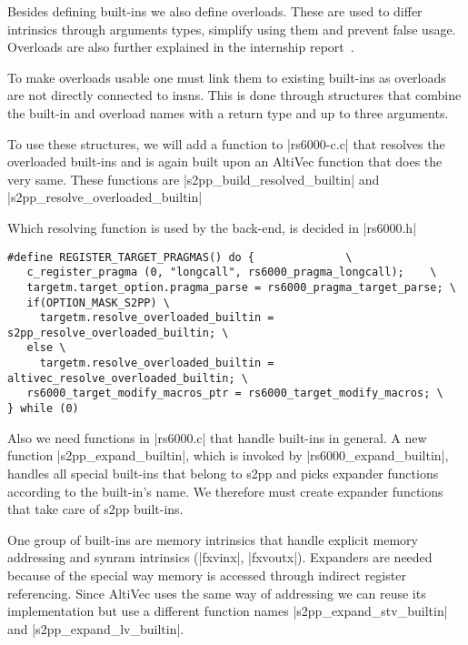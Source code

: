 Besides defining built-ins we also define overloads.
These are used to differ intrinsics through arguments types, simplify using them and prevent false usage.
Overloads are also further explained in the internship report~\citep{heimbrecht_2017internship}.

To make overloads usable one must link them to existing built-ins as overloads are not directly connected to insns.
This is done through structures that combine the built-in and overload names with a return type and up to three arguments.

To use these structures, we will add a function to |rs6000-c.c| that resolves the overloaded built-ins and is again built upon an AltiVec function that does the very same.
These functions are |s2pp_build_resolved_builtin| and |s2pp_resolve_overloaded_builtin|

Which resolving function is used by the back-end, is decided in |rs6000.h|
\begin{lstlisting}
#define REGISTER_TARGET_PRAGMAS() do {              \
   c_register_pragma (0, "longcall", rs6000_pragma_longcall);    \
   targetm.target_option.pragma_parse = rs6000_pragma_target_parse; \
   if(OPTION_MASK_S2PP) \
     targetm.resolve_overloaded_builtin = s2pp_resolve_overloaded_builtin; \
   else \
     targetm.resolve_overloaded_builtin = altivec_resolve_overloaded_builtin; \
   rs6000_target_modify_macros_ptr = rs6000_target_modify_macros; \
} while (0)
\end{lstlisting}

Also we need functions in |rs6000.c| that handle built-ins in general.
A new function |s2pp_expand_builtin|, which is invoked by |rs6000_expand_builtin|, handles all special built-ins that belong to s2pp and picks expander functions according to the built-in's name.
We therefore must create expander functions that take care of s2pp built-ins.

One group of built-ins are memory intrinsics that handle explicit memory addressing and synram intrinsics (|fxvinx|, |fxvoutx|).
Expanders are needed because of the special way memory is accessed through indirect register referencing.
Since AltiVec uses the same way of addressing we can reuse its implementation but use a different function names |s2pp_expand_stv_builtin| and |s2pp_expand_lv_builtin|.


